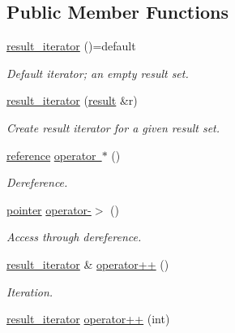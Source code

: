 \subsection*{Public Member Functions}
\begin{DoxyCompactItemize}
\item 
\mbox{\hyperlink{classnanodbc_1_1result__iterator_a3802a8a11ad2f043484be879e92fbd33}{result\+\_\+iterator}} ()=default
\begin{DoxyCompactList}\small\item\em Default iterator; an empty result set. \end{DoxyCompactList}\item 
\mbox{\hyperlink{classnanodbc_1_1result__iterator_af0cd8c4ea131a971a4ee616fde1a8eca}{result\+\_\+iterator}} (\mbox{\hyperlink{classnanodbc_1_1result}{result}} \&r)
\begin{DoxyCompactList}\small\item\em Create result iterator for a given result set. \end{DoxyCompactList}\item 
\mbox{\hyperlink{classnanodbc_1_1result__iterator_aeca21fe535e223231562d96a76c5ee92}{reference}} \mbox{\hyperlink{classnanodbc_1_1result__iterator_ab64d4ba85df82d3bf472611b14e47b4e}{operator $\ast$}} ()
\begin{DoxyCompactList}\small\item\em Dereference. \end{DoxyCompactList}\item 
\mbox{\hyperlink{classnanodbc_1_1result__iterator_a49329c62a4366740ff86be23ca1eef0d}{pointer}} \mbox{\hyperlink{classnanodbc_1_1result__iterator_a4f6eafe2226e141383d4461fa5de2746}{operator-\/$>$}} ()
\begin{DoxyCompactList}\small\item\em Access through dereference. \end{DoxyCompactList}\item 
\mbox{\hyperlink{classnanodbc_1_1result__iterator}{result\+\_\+iterator}} \& \mbox{\hyperlink{classnanodbc_1_1result__iterator_ab63c554a6588e6dfb0a16dbba8e01247}{operator++}} ()
\begin{DoxyCompactList}\small\item\em Iteration. \end{DoxyCompactList}\item 
\mbox{\hyperlink{classnanodbc_1_1result__iterator}{result\+\_\+iterator}} \mbox{\hyperlink{classnanodbc_1_1result__iterator_acf9cdfaccbdad7650b11fb77be994aa4}{operator++}} (int)

\end{DoxyCompactItemize}
